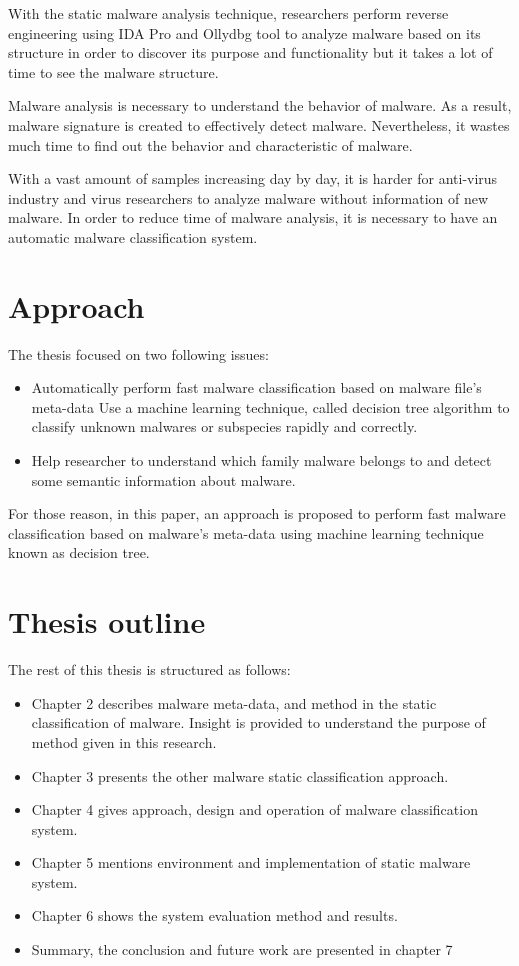 With the static malware analysis technique, researchers perform reverse engineering using IDA Pro and Ollydbg tool to analyze malware based on its structure in order to discover its purpose and functionality but it takes a lot of time to see the malware structure. 

Malware analysis is necessary to understand the behavior of malware. As a result, malware signature is created to effectively detect malware. Nevertheless, it wastes much time to find out the behavior and characteristic of malware.

With a vast amount of samples increasing day by day, it is harder for anti-virus industry and virus researchers to analyze malware without information of new malware. In order to reduce time of malware analysis, it is necessary to have an automatic malware classification system.

\section{Approach}

The thesis focused on two following issues:
\begin{itemize}
\item Automatically perform fast malware classification based on malware file's meta-data Use a machine learning technique, called decision tree algorithm to classify unknown malwares or subspecies rapidly and correctly.

\item Help researcher to understand which family malware belongs to and detect some semantic information about malware. 
\end{itemize}

For those reason, in this paper, an approach is proposed to perform fast malware classification based on malware's meta-data using machine learning technique known as decision tree.

\section{Thesis outline}
The rest of this thesis is structured as follows: \begin{itemize}
\item Chapter 2 describes malware meta-data, and method in the static classification of malware. Insight is provided to understand the purpose of method given in this research.
\item Chapter 3 presents the other malware static classification approach.
\item Chapter 4 gives approach, design and operation of malware classification system.
\item Chapter 5 mentions environment and implementation of static malware system.
\item Chapter 6 shows the system evaluation method and results. 
\item Summary, the conclusion and future work are presented in chapter 7
\end{itemize}
